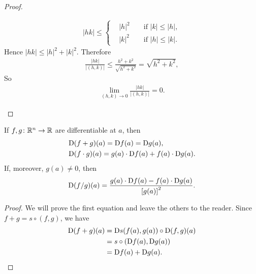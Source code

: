 \begin{proof}
\begin{enumerate}[label={\upshape(\arabic*)}]
\begin{align*}
                |hk| \le \left\{\begin{aligned}
                    & |h|^2 && \text{ if } |k| \le |h|, \\
                    & |k|^2 && \text{ if } |h| \le |k|.
                \end{aligned}\right.
            \end{align*}
            Hence $|hk|\le |h|^2 + |k|^2$. Therefore 
            \begin{align*}
                \frac{|hk|}{|(h, k)|} \le \frac{h^2 + k^2}{\sqrt{h^2 + k^2}} = \sqrt{h^2 + k^2},
            \end{align*}
            So 
            \begin{align*}
                \lim_{(h, k)\to 0}{\frac{|hk|}{|(h, k)|}} = 0.
            \end{align*}
    \end{enumerate}
\end{proof}


\begin{corollary}
    If $f,g\colon{}\mathbb{R}^n\to \mathbb{R}$ are differentiable at $a$, then 
    \begin{align*}
        & \mathrm{D}(f+g)(a) = \mathrm{D}f(a) = \mathrm{D}g(a), \\
        & \mathrm{D}(f\cdot g)(a) = g(a)\cdot \mathrm{D}f(a) + f(a)\cdot \mathrm{D}g(a).
    \end{align*}
    If, moreover, $g(a)\neq 0$, then 
    \begin{align*}
        \mathrm{D}(f/g)(a) = \frac{g(a)\cdot \mathrm{D}f(a) - f(a)\cdot \mathrm{D}g(a)}{\left[g(a)\right]^2}.
    \end{align*} 
\end{corollary}

\begin{proof}
    We will prove the first equation and leave the others
    to the reader. Since $f+g = s\circ (f, g)$, we have 
    \begin{align*}
        \mathrm{D}(f+g)(a)
        & = \mathrm{D}s(f(a),g(a))\circ \mathrm{D}(f,g)(a)  \\
        & = s\circ(\mathrm{D}f(a),\mathrm{D}g(a)) \\
        & = \mathrm{D}f(a)+\mathrm{D}g(a).
    \end{align*}
\end{proof}

